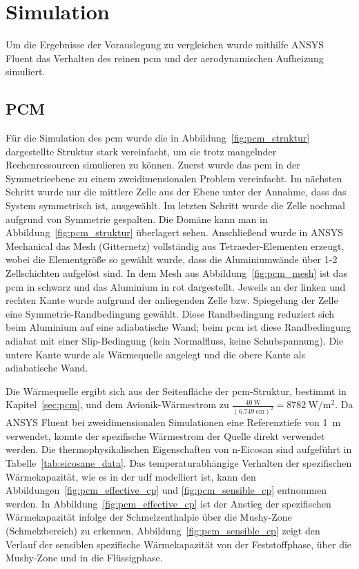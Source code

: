 \chapter{Simulation}\label{chap:Simulation}

Um die Ergebnisse der Vorauslegung zu vergleichen wurde mithilfe ANSYS Fluent das Verhalten des reinen \ac{pcm} und der
aerodynamischen Aufheizung simuliert.

\section{PCM}\label{sec:sim_pcm}

Für die Simulation des \ac{pcm} wurde die in Abbildung~\ref{fig:pcm_struktur} dargestellte Struktur stark vereinfacht,
um sie trotz mangelnder Rechenressourcen simulieren zu können. Zuerst wurde das \ac{pcm} in der Symmetrieebene
zu einem zweidimensionalen Problem vereinfacht. Im nächsten Schritt wurde nur die mittlere Zelle aus der Ebene unter der Annahme,
dass das System symmetrisch ist, ausgewählt. Im letzten Schritt wurde die Zelle nochmal aufgrund von Symmetrie gespalten.
Die Domäne kann man in Abbildung~\ref{fig:pcm_struktur} überlagert sehen.
Anschließend wurde in ANSYS Mechanical das Mesh (Gitternetz) vollständig aus Tetraeder-Elementen erzeugt, wobei die Elementgröße so gewählt
wurde, dass die Aluminiumwände über 1-2 Zellschichten aufgelöst sind. In dem Mesh aus Abbildung~\ref{fig:pcm_mesh} ist das \ac{pcm} in schwarz und das Aluminium
in rot dargestellt. Jeweils an der linken und rechten Kante wurde aufgrund der anliegenden Zelle bzw. Spiegelung der Zelle eine
Symmetrie-Randbedingung gewählt. Diese Randbedingung reduziert sich beim Aluminium auf eine adiabatische Wand; beim \ac{pcm}
ist diese Randbedingung adiabat mit einer Slip-Bedingung (kein Normalfluss, keine Schubspannung). Die untere Kante wurde als Wärmequelle angelegt und die obere Kante als adiabatische Wand.

Die Wärmequelle ergibt sich aus der Seitenfläche der \ac{pcm}-Struktur, bestimmt in Kapitel~\ref{sec:pcm}, und dem Avionik-Wärmestrom zu
$\frac{\SI{40}{\watt}}{\left(\SI{6,749}{\centi\meter}\right)^2} = \SI{8782}{\watt\per\meter\squared}$.
Da ANSYS Fluent bei zweidimensionalen Simulationen eine Referenztiefe von \SI{1}{m} verwendet, konnte der spezifische Wärmestrom
der Quelle direkt verwendet werden.
Die thermophysikalischen Eigenschaften von n-Eicosan sind aufgeführt in Tabelle~\ref{tab:eicosane_data}.
Das temperaturabhängige Verhalten der spezifischen Wärmekapazität, wie es in der \ac{udf} modelliert ist, kann den Abbildungen~\ref{fig:pcm_effective_cp} und \ref{fig:pcm_sensible_cp}
entnommen werden. In Abbildung~\ref{fig:pcm_effective_cp} ist der Anstieg der spezifischen Wärmekapazität infolge der
Schmelzenthalpie über die Mushy-Zone (Schmelzbereich) zu erkennen. Abbildung~\ref{fig:pcm_sensible_cp} zeigt den Verlauf der sensiblen spezifische Wärmekapazität
von der Feststoffphase, über die Mushy-Zone und in die Flüssigphase.

